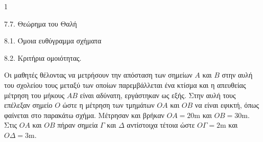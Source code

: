 \begin{ylh}{1}
    \item 7.7. Θεώρημα του Θαλή
    \item 8.1. Όμοια ευθύγραμμα σχήματα
    \item 8.2. Κριτήρια ομοιότητας.
\end{ylh}
\begin{figure} %
\centering
{}
\end{figure}
Οι μαθητές θέλοντας να μετρήσουν την απόσταση των σημείων $A$ και $B$ στην αυλή του σχολείου τους μεταξύ των οποίων παρεμβάλλεται ένα κτίσμα και η απευθείας μέτρηση του μήκους $AB$ είναι αδύνατη, εργάστηκαν ως εξής. Στην αυλή τους επέλεξαν σημείο $O$ ώστε η μέτρηση των τμημάτων $OA$ και $OB$ να είναι εφικτή, όπως φαίνεται στο παρακάτω σχήμα. Μέτρησαν και βρήκαν $OA=20\text{m}$ και $OB=30\text{m}$. Στις $OA$ και $OB$ πήραν σημεία $\Gamma$ και $\Delta$ αντίστοιχα τέτοια ώστε $O\Gamma=2\text{m}$ και $O\Delta=3\text{m}$.

